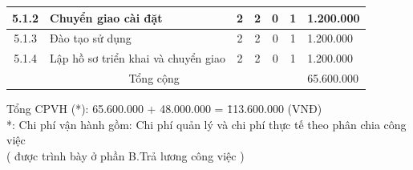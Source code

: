 \begin{longtable}{|c|p{3cm}|c|c|c|c|p{3cm}|}
    5.1.2                           & Chuyển giao cài đặt                                           & 2                                              & 2                                               & 0                                                               & 1                  & 1.200.000  \\ \hline
    5.1.3                           & Đào tạo sử dụng                                               & 2                                              & 2                                               & 0                                                               & 1                  & 1.200.000  \\ \hline
    5.1.4                           & Lập hồ sơ triển khai và chuyển giao                           & 2                                              & 2                                               & 0                                                               & 1                  & 1.200.000  \\ \hline
    \multicolumn{6}{|c|}{Tổng cộng} & 65.600.000                                                                                                                                                                                                                                                           \\ \hline
\end{longtable}

\begin{tabbing}
    Tổng CPVH (*): 65.600.000 + 48.000.000 = \= 113.600.000 (VNĐ) \\
    *: Chi phí vận hành gồm: Chi phí quản lý và chi phí thực tế theo phân chia công việc \\
    ( được trình bày ở phần B.Trả lương công việc ) 
\end{tabbing}

